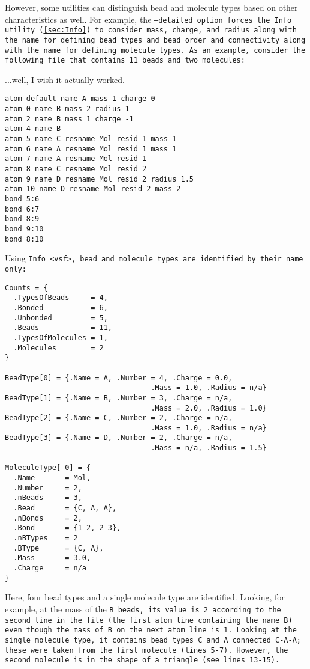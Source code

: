 However, some utilities can distinguish bead and molecule types based on
other characteristics as well. For example, the \tt{--detailed} option
forces the \tt{Info} utility (\ref{sec:Info}) to consider mass,
charge, and radius along with the name for defining bead types and bead
order and connectivity along with the name for defining molecule types. As
an example, consider the following \vsf file that contains 11 beads and
two molecules:

...well, I wish it actually worked.

\begin{lstlisting}
atom default name A mass 1 charge 0
atom 0 name B mass 2 radius 1
atom 2 name B mass 1 charge -1
atom 4 name B
atom 5 name C resname Mol resid 1 mass 1
atom 6 name A resname Mol resid 1 mass 1
atom 7 name A resname Mol resid 1
atom 8 name C resname Mol resid 2
atom 9 name D resname Mol resid 2 radius 1.5
atom 10 name D resname Mol resid 2 mass 2
bond 5:6
bond 6:7
bond 8:9
bond 9:10
bond 8:10
\end{lstlisting}

Using \tt{Info <vsf>}, bead and molecule types are identified by their name
only:

\begin{lstlisting}
Counts = {
  .TypesOfBeads     = 4,
  .Bonded           = 6,
  .Unbonded         = 5,
  .Beads            = 11,
  .TypesOfMolecules = 1,
  .Molecules        = 2
}

BeadType[0] = {.Name = A, .Number = 4, .Charge = 0.0,
                                  .Mass = 1.0, .Radius = n/a}
BeadType[1] = {.Name = B, .Number = 3, .Charge = n/a,
                                  .Mass = 2.0, .Radius = 1.0}
BeadType[2] = {.Name = C, .Number = 2, .Charge = n/a,
                                  .Mass = 1.0, .Radius = n/a}
BeadType[3] = {.Name = D, .Number = 2, .Charge = n/a,
                                  .Mass = n/a, .Radius = 1.5}

MoleculeType[ 0] = {
  .Name       = Mol,
  .Number     = 2,
  .nBeads     = 3,
  .Bead       = {C, A, A},
  .nBonds     = 2,
  .Bond       = {1-2, 2-3},
  .nBTypes    = 2
  .BType      = {C, A},
  .Mass       = 3.0,
  .Charge     = n/a
}
\end{lstlisting}

Here, four bead types and a single molecule type are identified. Looking,
for example, at the mass of the \tt{B} beads, its value is 2 according to
the second line in the \vsf file (the first atom line containing the name
\tt{B}) even though the mass of \tt{B} on the next atom line is 1. Looking
at the single molecule type, it contains bead types \tt{C} and \tt{A}
connected \tt{C-A-A}; these were taken from the first molecule (\vsf lines
5-7). However, the second molecule is in the shape of a triangle (see \vsf
lines 13-15).

